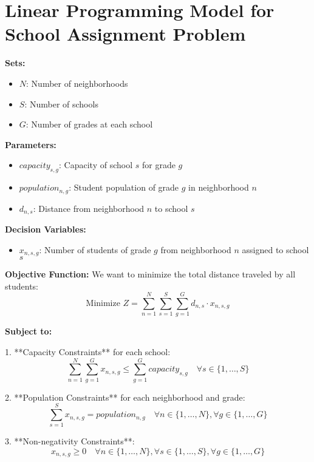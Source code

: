 \documentclass{article}
\begin{document}
\section*{Linear Programming Model for School Assignment Problem}

\textbf{Sets:}
\begin{itemize}
    \item $N$: Number of neighborhoods
    \item $S$: Number of schools
    \item $G$: Number of grades at each school
\end{itemize}

\textbf{Parameters:}
\begin{itemize}
    \item $capacity_{s,g}$: Capacity of school $s$ for grade $g$
    \item $population_{n,g}$: Student population of grade $g$ in neighborhood $n$
    \item $d_{n,s}$: Distance from neighborhood $n$ to school $s$
\end{itemize}

\textbf{Decision Variables:}
\begin{itemize}
    \item $x_{n,s,g}$: Number of students of grade $g$ from neighborhood $n$ assigned to school $s$
\end{itemize}

\textbf{Objective Function:}
We want to minimize the total distance traveled by all students:
\[
\text{Minimize } Z = \sum_{n=1}^{N} \sum_{s=1}^{S} \sum_{g=1}^{G} d_{n,s} \cdot x_{n,s,g}
\]

\textbf{Subject to:}

1. **Capacity Constraints** for each school:
\[
\sum_{n=1}^{N} \sum_{g=1}^{G} x_{n,s,g} \leq \sum_{g=1}^{G} capacity_{s,g} \quad \forall s \in \{1, \ldots, S\}
\]

2. **Population Constraints** for each neighborhood and grade:
\[
\sum_{s=1}^{S} x_{n,s,g} = population_{n,g} \quad \forall n \in \{1, \ldots, N\}, \forall g \in \{1, \ldots, G\}
\]

3. **Non-negativity Constraints**:
\[
x_{n,s,g} \geq 0 \quad \forall n \in \{1, \ldots, N\}, \forall s \in \{1, \ldots, S\}, \forall g \in \{1, \ldots, G\}
\]
\end{document}
